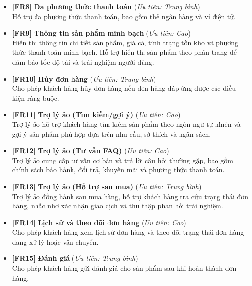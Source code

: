 \begin{itemize}
\item \textbf{[FR8] Đa phương thức thanh toán} \hfill (\textit{Ưu tiên: Trung bình})\\
    Hỗ trợ đa phương thức thanh toán, bao gồm thẻ ngân hàng và ví điện tử.

\item \textbf{[FR9] Thông tin sản phẩm minh bạch} \hfill (\textit{Ưu tiên: Cao})\\
    Hiển thị thông tin chi tiết sản phẩm, giá cả, tình trạng tồn kho và phương thức thanh toán minh bạch.
    Hỗ trợ hiển thị sản phẩm theo phân trang để đảm bảo tốc độ tải và trải nghiệm người dùng.

\item \textbf{[FR10] Hủy đơn hàng} \hfill (\textit{Ưu tiên: Trung bình})\\
    Cho phép khách hàng hủy đơn hàng nếu đơn hàng đáp ứng được các điều kiện ràng buộc.

\item \textbf{[FR11] Trợ lý ảo (Tìm kiếm/gợi ý)} \hfill (\textit{Ưu tiên: Cao})\\
    Trợ lý ảo hỗ trợ khách hàng tìm kiếm sản phẩm theo ngôn ngữ tự nhiên và gợi ý sản phẩm phù hợp dựa trên nhu cầu, sở thích và ngân sách.

\item \textbf{[FR12] Trợ lý ảo (Tư vấn FAQ)} \hfill (\textit{Ưu tiên: Cao})\\
    Trợ lý ảo cung cấp tư vấn cơ bản và trả lời câu hỏi thường gặp, bao gồm chính sách bảo hành, đổi trả, khuyến mãi và phương thức thanh toán.

\item \textbf{[FR13] Trợ lý ảo (Hỗ trợ sau mua)} \hfill (\textit{Ưu tiên: Trung bình})\\
    Trợ lý ảo đồng hành sau mua hàng, hỗ trợ khách hàng tra cứu trạng thái đơn hàng, nhắc nhở xác nhận giao dịch và thu thập phản hồi trải nghiệm.

\item \textbf{[FR14] Lịch sử và theo dõi đơn hàng} \hfill (\textit{Ưu tiên: Cao})\\
    Cho phép khách hàng xem lịch sử đơn hàng và theo dõi trạng thái đơn hàng đang xử lý hoặc vận chuyển.

\item \textbf{[FR15] Đánh giá} \hfill (\textit{Ưu tiên: Trung bình})\\
    Cho phép khách hàng gửi đánh giá cho sản phẩm sau khi hoàn thành đơn hàng.

\end{itemize}

